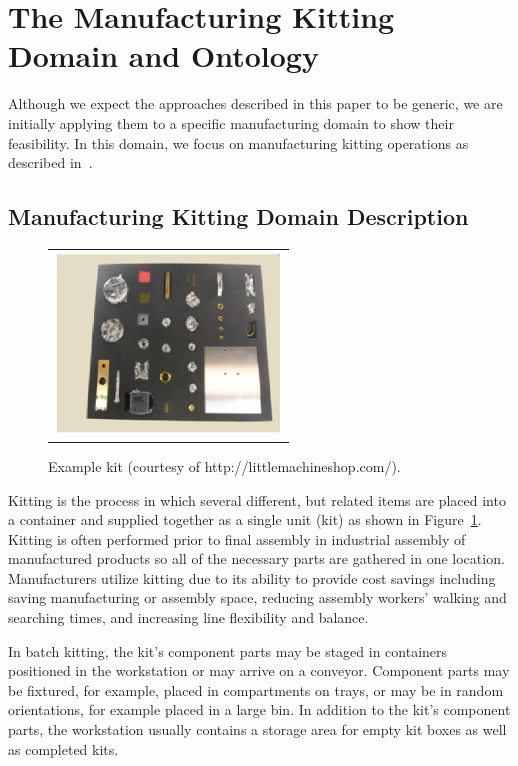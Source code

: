 \documentclass[preprint,12pt]{elsarticle}
\begin{document}
\section{The Manufacturing Kitting Domain and Ontology}\label{S:section3}
Although we expect the approaches described in this paper to be generic, we are initially applying them to a specific manufacturing domain to show their feasibility. In this domain, we focus on manufacturing kitting operations as described in~\cite{Balakirsky.IROS.2012}.


\subsection{Manufacturing Kitting Domain Description}
\begin{figure}[h!b!]
\begin{center}
\begin{tabular}{c}
\includegraphics[width=6cm]{kit.eps}
\end{tabular}
\end{center}
\caption{Example kit (courtesy of http://littlemachineshop.com/).}
\label{fig:kit}
\end{figure}
Kitting is the process in which several different, but related items are placed into a container and supplied together as a single unit (kit) as shown in Figure~\ref{fig:kit}. Kitting is often performed prior to final assembly in industrial assembly of manufactured products so all of the necessary parts are gathered in one location. Manufacturers utilize kitting due to its ability to provide cost savings including saving manufacturing or assembly space, reducing assembly workers' walking and searching times, and increasing line flexibility and balance.


In batch kitting, the kit's component parts may be staged in containers positioned in the workstation or may arrive on a conveyor. Component parts may be fixtured, for example, placed in compartments on trays, or may be in random orientations, for example placed in a large bin. In addition to the kit's component parts, the workstation usually contains a storage area for empty kit boxes as well as completed kits.
\end{document}

